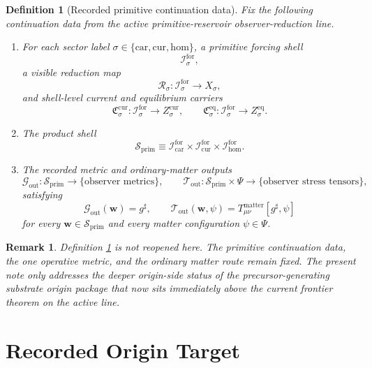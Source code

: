 \documentclass[11pt]{article}
\newcommand{\CompletedMetric}{g^{\sharp}}
\newcommand{\Car}{\mathrm{car}}
\newcommand{\Cur}{\mathrm{cur}}
\newcommand{\Hom}{\mathrm{hom}}
\newcommand{\ForSpace}[1]{\mathcal I_{#1}^{\mathrm{for}}}
\newcommand{\PrimShell}{\mathcal S_{\mathrm{prim}}}
\newcommand{\Reduction}[1]{\mathcal R_{#1}}
\newcommand{\CurrentCarrier}[1]{\mathfrak C_{#1}^{\mathrm{cur}}}
\newcommand{\EqCarrier}[1]{\mathfrak C_{#1}^{\mathrm{eq}}}
\newcommand{\MetricOut}{\mathscr G_{\mathrm{out}}}
\newcommand{\MatterOut}{\mathscr T_{\mathrm{out}}}
\newtheorem{definition}{Definition}
\newtheorem{remark}{Remark}
\begin{document}
\begin{definition}[Recorded primitive continuation data]
\label{def:fixed}
Fix the following continuation data from the active primitive-reservoir observer-reduction line.
\begin{enumerate}
    \item For each sector label \(\sigma\in\{\Car,\Cur,\Hom\}\), a primitive forcing shell
    \[
    \ForSpace{\sigma},
    \]
    a visible reduction map
    \[
    \Reduction{\sigma}:\ForSpace{\sigma}\to X_{\sigma},
    \]
    and shell-level current and equilibrium carriers
    \[
    \CurrentCarrier{\sigma}:\ForSpace{\sigma}\to Z_{\sigma}^{\mathrm{cur}},
    \qquad
    \EqCarrier{\sigma}:\ForSpace{\sigma}\to Z_{\sigma}^{\mathrm{eq}}.
    \]
    \item The product shell
    \[
    \PrimShell
    \equiv
    \ForSpace{\Car}\times \ForSpace{\Cur}\times \ForSpace{\Hom}.
    \]
    \item The recorded metric and ordinary-matter outputs
    \[
    \MetricOut:\PrimShell\to\{\text{observer metrics}\},
    \qquad
    \MatterOut:\PrimShell\times\Psi\to\{\text{observer stress tensors}\},
    \]
    satisfying
    \begin{equation}
    \MetricOut(\mathbf w)=\CompletedMetric,
    \qquad
    \MatterOut(\mathbf w,\psi)
    =
    T_{\mu\nu}^{\mathrm{matter}}[\CompletedMetric,\psi]
    \label{eq:fixedoutputs}
    \end{equation}
    for every \(\mathbf w\in\PrimShell\) and every matter configuration \(\psi\in\Psi\).
\end{enumerate}
\end{definition}

\begin{remark}
Definition \ref{def:fixed} is not reopened here. The primitive continuation data, the one operative metric, and the ordinary matter route remain fixed. The present note only addresses the deeper origin-side status of the precursor-generating substrate origin package that now sits immediately above the current frontier theorem on the active line.
\end{remark}

\section{Recorded Origin Target}
\end{document}
